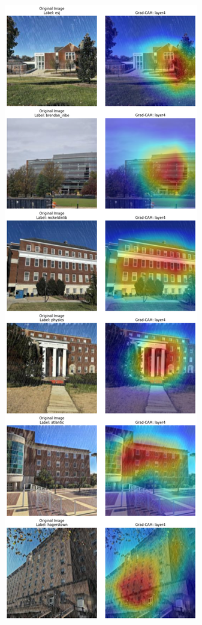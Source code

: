 \documentclass{article}
\begin{document}
\begin{figure}[H]
    \centering
    \begin{subfigure}[b]{0.45\linewidth}
        \centering
        \includegraphics[width=\linewidth]{gradcam_result3.png}

\end{subfigure}
\end{figure}
\end{document}
